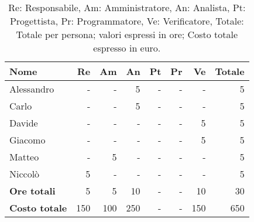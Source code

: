 \begin{table}[H]
	\centering
	\begin{tabular}{l|r|r|r|r|r|r|r}
	\textbf{Nome} & \textbf{Re} & \textbf{Am} & \textbf{An} & \textbf{Pt} & \textbf{Pr} & \textbf{Ve} & \textbf{Totale} \\
	\hline
		Alessandro & - & - & 5 & - & - & - & 5 \\
		Carlo & - & - & 5 & - & - & - & 5 \\
		Davide & - & - & - & - & - & 5 & 5 \\
		Giacomo & - & - & - & - & - & 5 & 5 \\
		Matteo & - & 5 & - & - & - & - & 5 \\
		Niccolò & 5 & - & - & - & - & - & 5 \\
	\hline
	\textbf{Ore totali} & 5 & 5 & 10 & - & - & 10 & 30 \\
	\textbf{Costo totale} & 150 & 100 & 250 & - & - & 150 & 650
	\end{tabular}
	\caption{Re: Responsabile, Am: Amministratore, An: Analista, Pt: Progettista,
		Pr: Programmatore, Ve: Verificatore, Totale: Totale per persona; valori espressi in ore; Costo totale espresso in euro.} 
\end{table}


